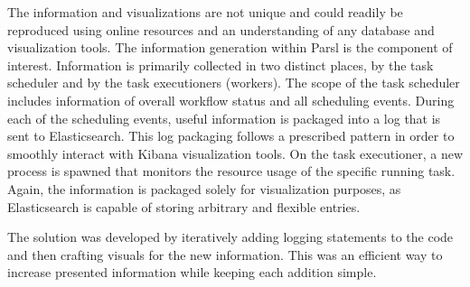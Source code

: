 The information and visualizations are not unique and could readily be reproduced using online resources and an understanding of any database and visualization tools.
The information generation within Parsl is the component of interest.
Information is primarily collected in two distinct places, by the task scheduler and by the task executioners (workers).
The scope of the task scheduler includes information of overall workflow status and all scheduling events.
During each of the scheduling events, useful information is packaged into a log that is sent to Elasticsearch.
This log packaging follows a prescribed pattern in order to smoothly interact with Kibana visualization tools.
On the task executioner, a new process is spawned that monitors the resource usage of the specific running task.
Again, the information is packaged solely for visualization purposes, as Elasticsearch is capable of storing arbitrary and flexible entries.

The solution was developed by iteratively adding logging statements to the code and then crafting visuals for the new information.
This was an efficient way to increase presented information while keeping each addition simple.
